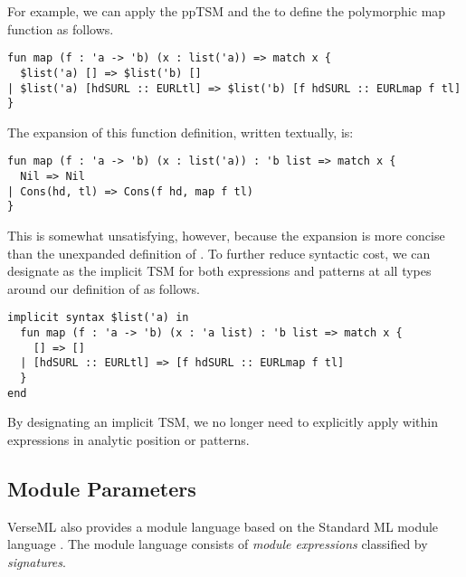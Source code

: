 For example, we can apply the ppTSM  and the  to define the polymorphic map function as follows.
\begin{lstlisting}[numbers=none]
fun map (f : 'a -> 'b) (x : list('a)) => match x { 
  $list('a) [] => $list('b) []
| $list('a) [hdSURL :: EURLtl] => $list('b) [f hdSURL :: EURLmap f tl]
}
\end{lstlisting}
The expansion of this function definition, written textually, is:
\begin{lstlisting}[numbers=none]
fun map (f : 'a -> 'b) (x : list('a)) : 'b list => match x { 
  Nil => Nil
| Cons(hd, tl) => Cons(f hd, map f tl)
}
\end{lstlisting}
This is somewhat unsatisfying, however, because the expansion is more concise than the unexpanded definition of . To further reduce syntactic cost, we can designate  as the implicit TSM for both expressions and patterns at all types  around our definition of  as follows.
\begin{lstlisting}[numbers=none]
implicit syntax $list('a) in
  fun map (f : 'a -> 'b) (x : 'a list) : 'b list => match x {
    [] => []
  | [hdSURL :: EURLtl] => [f hdSURL :: EURLmap f tl]
  }
end
\end{lstlisting}
By designating an implicit TSM, we no longer need to explicitly apply  within expressions in analytic position or patterns.

\subsection{Module Parameters}\label{sec:module-parameters}
VerseML also provides a module language based on the Standard ML module language \cite{MacQueen:1984:MSM:800055.802036}. The module language consists of \emph{module expressions} classified by \emph{signatures}. %


